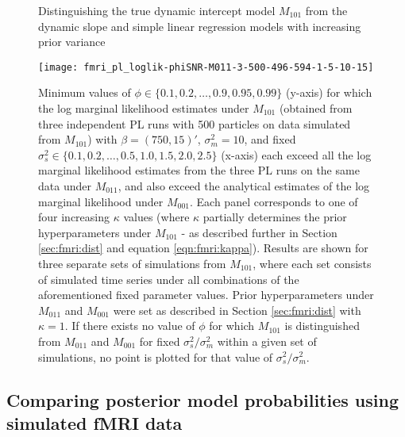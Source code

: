 \begin{figure}
\ssp
\centering
\caption{Distinguishing the true dynamic intercept model $M_{101}$ from the dynamic slope and simple linear regression models with increasing prior variance} \label{fig:fmri:kappa:M101}
\texttt{[image: fmri\_pl\_loglik-phiSNR-M011-3-500-496-594-1-5-10-15]}
\caption*{Minimum values of $\phi \in \{0.1,0.2,\ldots,0.9,0.95,0.99\}$ (y-axis) for which the log marginal likelihood estimates under $M_{101}$ (obtained from three independent PL runs with 500 particles on data simulated from $M_{101}$) with $\beta = (750,15)'$, $\sigma^2_m = 10$, and fixed $\sigma^2_s \in \{0.1,0.2,\ldots,0.5,1.0,1.5,2.0,2.5\}$ (x-axis) each exceed all the log marginal likelihood estimates from the three PL runs on the same data under $M_{011}$, and also exceed the analytical estimates of the log marginal likelihood under $M_{001}$.
Each panel corresponds to one of four increasing $\kappa$ values (where $\kappa$ partially determines the prior hyperparameters under $M_{101}$ - as described further in Section \ref{sec:fmri:dist} and equation \eqref{eqn:fmri:kappa}). Results are shown for three
separate sets of simulations from $M_{101}$, where each set consists of simulated time series under all combinations of the aforementioned fixed parameter values. Prior hyperparameters under $M_{011}$ and $M_{001}$ were set as described in Section \ref{sec:fmri:dist} with $\kappa = 1$. If there exists no value of $\phi$ for which $M_{101}$ is distinguished from $M_{011}$ and $M_{001}$ for fixed $\sigma^2_s / \sigma^2_m$ within a given set of simulations, no point is plotted for that value of $\sigma^2_s / \sigma^2_m$.}
\end{figure}

\subsection{Comparing posterior model probabilities using simulated fMRI data \label{sec:fmri:part}}

